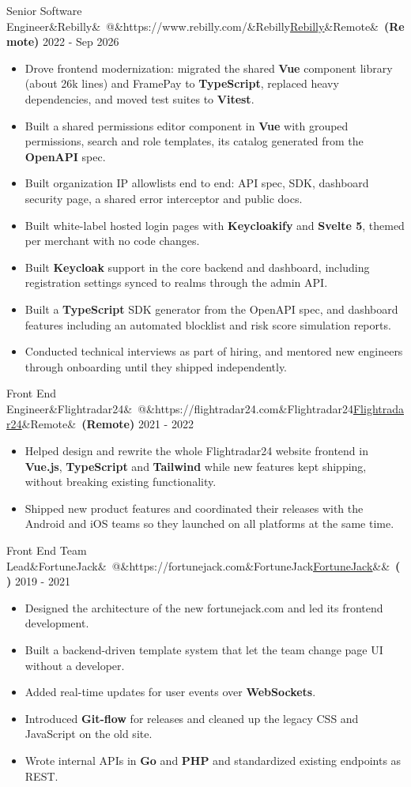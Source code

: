 \documentclass[10pt]{article}
\makeatletter
\newcommand{\weblink}[2]{\href{#1}{\textcolor{linkblue}{\underline{#2}}}}
\newcommand{\role}[5]{%
  \vspace{5pt}\par\noindent
  {\normalsize #1\ifx&#2&\else\ @\ifx&#3&#2\else\weblink{#3}{#2}\fi\fi\ifx&#4&\else\ \textbf{(#4)}\fi}%
  \hfill{\footnotesize #5}\par\nopagebreak\vspace{1pt}}
\makeatother
\begin{document}
\role{Senior Software Engineer}{Rebilly}{https://www.rebilly.com/}{Remote}{2022 - Sep 2026}
\begin{itemize}
  \item Drove frontend modernization: migrated the shared \textbf{Vue} component library (about 26k lines) and FramePay to \textbf{TypeScript}, replaced heavy dependencies, and moved test suites to \textbf{Vitest}.
  \item Built a shared permissions editor component in \textbf{Vue} with grouped permissions, search and role templates, its catalog generated from the \textbf{OpenAPI} spec.
  \item Built organization IP allowlists end to end: API spec, SDK, dashboard security page, a shared error interceptor and public docs.
  \item Built white-label hosted login pages with \textbf{Keycloakify} and \textbf{Svelte 5}, themed per merchant with no code changes.
  \item Built \textbf{Keycloak} support in the core backend and dashboard, including registration settings synced to realms through the admin API.
  \item Built a \textbf{TypeScript} SDK generator from the OpenAPI spec, and dashboard features including an automated blocklist and risk score simulation reports.
  \item Conducted technical interviews as part of hiring, and mentored new engineers through onboarding until they shipped independently.
\end{itemize}

\role{Front End Engineer}{Flightradar24}{https://flightradar24.com}{Remote}{2021 - 2022}
\begin{itemize}
  \item Helped design and rewrite the whole Flightradar24 website frontend in \textbf{Vue.js}, \textbf{TypeScript} and \textbf{Tailwind} while new features kept shipping, without breaking existing functionality.
  \item Shipped new product features and coordinated their releases with the Android and iOS teams so they launched on all platforms at the same time.
\end{itemize}

\role{Front End Team Lead}{FortuneJack}{https://fortunejack.com}{}{2019 - 2021}
\begin{itemize}
  \item Designed the architecture of the new fortunejack.com and led its frontend development.
  \item Built a backend-driven template system that let the team change page UI without a developer.
  \item Added real-time updates for user events over \textbf{WebSockets}.
  \item Introduced \textbf{Git-flow} for releases and cleaned up the legacy CSS and JavaScript on the old site.
  \item Wrote internal APIs in \textbf{Go} and \textbf{PHP} and standardized existing endpoints as REST.
\end{itemize}
\end{document}
